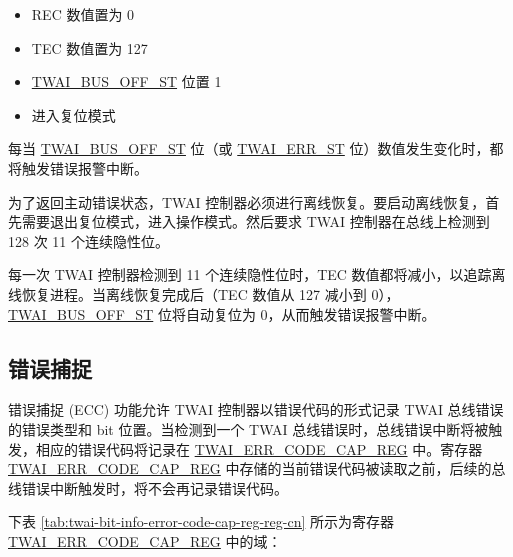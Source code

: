 \documentclass[main\_\_CN.tex]{subfiles}
\begin{document}
\begin{itemize}
    \item REC 数值置为 0
    \item TEC 数值置为 127
    \item \hyperref[fielddesc:TWAIBUSOFFST]{TWAI\_BUS\_OFF\_ST} 位置 1
    \item 进入复位模式
\end{itemize}

每当 \hyperref[fielddesc:TWAIBUSOFFST]{TWAI\_BUS\_OFF\_ST} 位（或 \hyperref[fielddesc:TWAIERRST]{TWAI\_ERR\_ST} 位）数值发生变化时，都将触发错误报警中断。

为了返回主动错误状态，TWAI 控制器必须进行离线恢复。要启动离线恢复，首先需要退出复位模式，进入操作模式。然后要求 TWAI 控制器在总线上检测到 128 次 11 个连续隐性位。

每一次 TWAI 控制器检测到 11 个连续隐性位时，TEC 数值都将减小，以追踪离线恢复进程。当离线恢复完成后（TEC 数值从 127 减小到 0），\hyperref[fielddesc:TWAIBUSOFFST]{TWAI\_BUS\_OFF\_ST} 位将自动复位为 0，从而触发错误报警中断。

\subsection{错误捕捉}

错误捕捉 (ECC) 功能允许 TWAI 控制器以错误代码的形式记录 TWAI 总线错误的错误类型和 bit 位置。当检测到一个 TWAI 总线错误时，总线错误中断将被触发，相应的错误代码将记录在 \hyperref[regdesc:TWAIERRCODECAPREG]{TWAI\_ERR\_CODE\_CAP\_REG} 中。寄存器 \hyperref[regdesc:TWAIERRCODECAPREG]{TWAI\_ERR\_CODE\_CAP\_REG} 中存储的当前错误代码被读取之前，后续的总线错误中断触发时，将不会再记录错误代码。

下表 \ref{tab:twai-bit-info-error-code-cap-reg-reg-cn} 所示为寄存器 \hyperref[regdesc:TWAIERRCODECAPREG]{TWAI\_ERR\_CODE\_CAP\_REG} 中的域：
\end{document}
